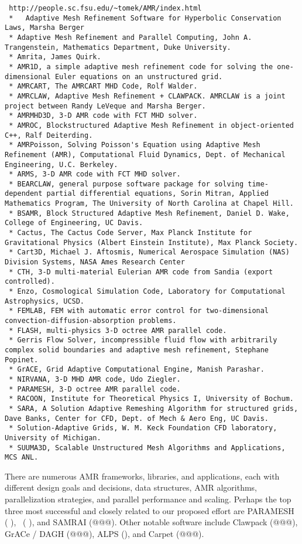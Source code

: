 \documentclass{article}
\begin{document}
\begin{verbatim}
 http://people.sc.fsu.edu/~tomek/AMR/index.html
 *   Adaptive Mesh Refinement Software for Hyperbolic Conservation Laws, Marsha Berger
 * Adaptive Mesh Refinement and Parallel Computing, John A. Trangenstein, Mathematics Department, Duke University.
 * Amrita, James Quirk.
 * AMR1D, a simple adaptive mesh refinement code for solving the one-dimensional Euler equations on an unstructured grid.
 * AMRCART, The AMRCART MHD Code, Rolf Walder.
 * AMRCLAW, Adaptive Mesh Refinement + CLAWPACK. AMRCLAW is a joint project between Randy LeVeque and Marsha Berger.
 * AMRMHD3D, 3-D AMR code with FCT MHD solver.
 * AMROC, Blockstructured Adaptive Mesh Refinement in object-oriented C++, Ralf Deiterding.
 * AMRPoisson, Solving Poisson's Equation using Adaptive Mesh Refinement (AMR), Computational Fluid Dynamics, Dept. of Mechanical Engineering, U.C. Berkeley.
 * ARMS, 3-D AMR code with FCT MHD solver.
 * BEARCLAW, general purpose software package for solving time-dependent partial differential equations, Sorin Mitran, Applied Mathematics Program, The University of North Carolina at Chapel Hill.
 * BSAMR, Block Structured Adaptive Mesh Refinement, Daniel D. Wake, College of Engineering, UC Davis.
 * Cactus, The Cactus Code Server, Max Planck Institute for Gravitational Physics (Albert Einstein Institute), Max Planck Society.
 * Cart3D, Michael J. Aftosmis, Numerical Aerospace Simulation (NAS) Division Systems, NASA Ames Research Center
 * CTH, 3-D multi-material Eulerian AMR code from Sandia (export controlled).
 * Enzo, Cosmological Simulation Code, Laboratory for Computational Astrophysics, UCSD.
 * FEMLAB, FEM with automatic error control for two-dimensional convection-diffusion-absorption problems.
 * FLASH, multi-physics 3-D octree AMR parallel code.
 * Gerris Flow Solver, incompressible fluid flow with arbitrarily complex solid boundaries and adaptive mesh refinement, Stephane Popinet.
 * GrACE, Grid Adaptive Computational Engine, Manish Parashar.
 * NIRVANA, 3-D MHD AMR code, Udo Ziegler.
 * PARAMESH, 3-D octree AMR parallel code.
 * RACOON, Institute for Theoretical Physics I, University of Bochum.
 * SARA, A Solution Adaptive Remeshing Algorithm for structured grids, Dave Banks, Center for CFD, Dept. of Mech & Aero Eng, UC Davis.
 * Solution-Adaptive Grids, W. M. Keck Foundation CFD laboratory, University of Michigan.
 * SUUMA3D, Scalable Unstructured Mesh Algorithms and Applications, MCS ANL. 
\end{verbatim}

There are numerous AMR frameworks, libraries, and applications, each
with different design goals and decisions, data structures, AMR
algorithms, parallelization strategies, and parallel performance and
scaling.  Perhaps the top three most successful and closely related to
our proposed effort are PARAMESH (\cite{MaOl00} \nocite{OlMa05}
\nocite{Ol06}), \chombo\  (\cite{wwwchombo} \cite{CoGr09}), and SAMRAI
(@@@).  Other notable software include Clawpack (@@@), GrACe / DAGH
(@@@), ALPS (\cite{BuBu09}), and Carpet (@@@).
\end{document}
